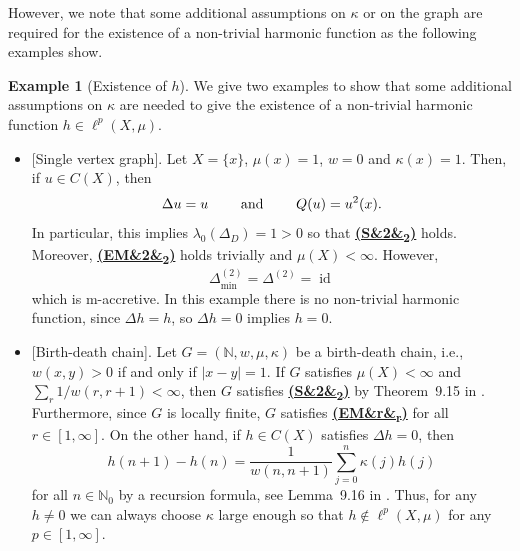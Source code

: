 \documentclass[letterpaper]{article}
\theoremstyle{definition}
\newtheorem{example}{Example}
\theoremstyle{named}
\numberwithin{equation}{section}
\newcommand{\EM}[1][]{\hyperlink{ass:EM}{\textup{\textbf{(EM\ifx&#1&\else\textsubscript{#1}\fi)}}}}
\newcommand{\SP}[1][]{\hyperlink{ass:SP}{\textup{\textbf{(S\ifx&#1&\else\textsubscript{#1}\fi)}}}}
\newcommand{\N}{\mathbb{N}}
\newcommand{\id}{\operatorname{id}}
\begin{document}
    However, we note that some additional assumptions on $\kappa$ or on the graph 
    are required for the existence
    of a non-trivial harmonic function as the following examples
    show.
    \begin{example}[Existence of $h$]
    We give two examples to show that some additional assumptions 
    on $\kappa$ are needed to give the existence of a non-trivial harmonic function
    $h \in \ell^p(X,\mu)$. 
    \begin{itemize}
    \item[(1)]{[Single vertex graph].}
    Let $X=\{x\}$, $\mu(x)=1$, $w=0$ and $\kappa(x)=1$. Then, if $u \in C(X)$, then
$$
\Delta u = u \qquad \textup{ and } \qquad  Q(u)=u^2(x).
$$
In particular, this implies $\lambda_0(\Delta_D)=1>0$ so that \SP[2] holds.
Moreover, \EM[2] holds trivially and $\mu(X)<\infty$.
However,
$$
    \Delta_{\min}^{(2)}=\Delta^{(2)}=\id
$$
which is m-accretive.
In this example there is no non-trivial harmonic function, since
$\Delta h=h$, so $\Delta h=0$ implies $h=0$.

    \item[(2)]{[Birth-death chain].} 
    Let $G=(\N,w, \mu, \kappa)$ be a birth-death chain, i.e., $w(x,y)>0$
        if and only if $|x-y|=1$. If $G$ satisfies $\mu(X)<\infty$ and $\sum_r 1/w(r,r+1)<\infty$,
        then $G$ satisfies \SP[2] by Theorem~9.15 in
        \cite{keller2021graphs}. Furthermore, since $G$ is locally finite, $G$ satisfies 
        \EM[r] for all $r\in[1,\infty]$.
        On the other hand, if $h \in C(X)$ satisfies $\Delta h=0$, then
        $$h(n+1)-h(n)=\frac{1}{w(n,n+1)} \sum_{j=0}^n \kappa(j)h(j)$$
        for all $n \in \N_0$ by a recursion formula, see Lemma~9.16 in \cite{keller2021graphs}.
        Thus, for any $h \neq 0$ we can always choose $\kappa$ large enough 
        so that $h \not \in \ell^p(X,\mu)$
        for any $p \in [1,\infty]$.
    \end{itemize}
    \end{example}
\end{document}
